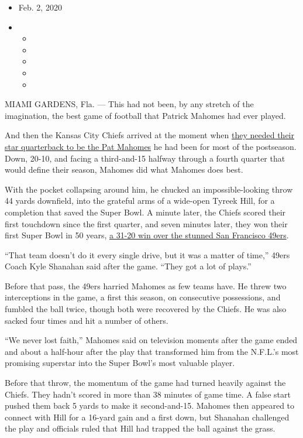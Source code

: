 \begin{itemize}
\item
  Feb. 2, 2020
\item
  \begin{itemize}
  \item
  \item
  \item
  \item
  \item
  \end{itemize}
\end{itemize}

MIAMI GARDENS, Fla. --- This had not been, by any stretch of the
imagination, the best game of football that Patrick Mahomes had ever
played.

And then the Kansas City Chiefs arrived at the moment when
\href{https://www.nytimes3xbfgragh.onion/2020/01/30/sports/football/Chiefs-patrick-mahomes.html}{they
needed their star quarterback to be the Pat Mahomes} he had been for
most of the postseason. Down, 20-10, and facing a third-and-15 halfway
through a fourth quarter that would define their season, Mahomes did
what Mahomes does best.

With the pocket collapsing around him, he chucked an impossible-looking
throw 44 yards downfield, into the grateful arms of a wide-open Tyreek
Hill, for a completion that saved the Super Bowl. A minute later, the
Chiefs scored their first touchdown since the first quarter, and seven
minutes later, they won their first Super Bowl in 50 years,
\href{https://www.nytimes3xbfgragh.onion/2020/02/02/sports/football/chiefs-49ers-super-bowl.html}{a
31-20 win over the stunned San Francisco 49ers}.

``That team doesn't do it every single drive, but it was a matter of
time,'' 49ers Coach Kyle Shanahan said after the game. ``They got a lot
of plays.''

Before that pass, the 49ers harried Mahomes as few teams have. He threw
two interceptions in the game, a first this season, on consecutive
possessions, and fumbled the ball twice, though both were recovered by
the Chiefs. He was also sacked four times and hit a number of others.

``We never lost faith,'' Mahomes said on television moments after the
game ended and about a half-hour after the play that transformed him
from the N.F.L.'s most promising superstar into the Super Bowl's most
valuable player.

Before that throw, the momentum of the game had turned heavily against
the Chiefs. They hadn't scored in more than 38 minutes of game time. A
false start pushed them back 5 yards to make it second-and-15. Mahomes
then appeared to connect with Hill for a 16-yard gain and a first down,
but Shanahan challenged the play and officials ruled that Hill had
trapped the ball against the grass.

